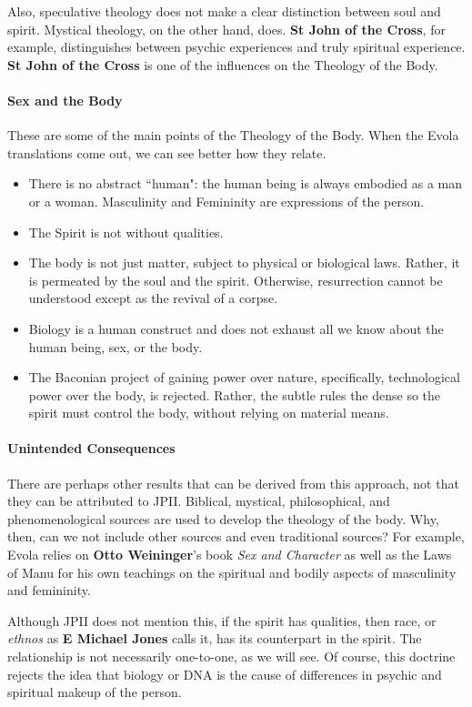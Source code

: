 Also, speculative theology does not make a clear distinction between soul and spirit. Mystical theology, on the other hand, does. \textbf{St John of the Cross}, for example, distinguishes between psychic experiences and truly spiritual experience. \textbf{St John of the Cross} is one of the influences on the Theology of the Body.

\paragraph{Sex and the Body}
These are some of the main points of the Theology of the Body. When the Evola translations come out, we can see better how they relate.

\begin{itemize}
\item There is no abstract ``human": the human being is always embodied as a man or a woman. Masculinity and Femininity are expressions of the person. 
\item The Spirit is not without qualities. 
\item The body is not just matter, subject to physical or biological laws. Rather, it is permeated by the soul and the spirit. Otherwise, resurrection cannot be understood except as the revival of a corpse. 
\item Biology is a human construct and does not exhaust all we know about the human being, sex, or the body. 
\item The Baconian project of gaining power over nature, specifically, technological power over the body, is rejected. Rather, the subtle rules the dense so the spirit must control the body, without relying on material means. 
\end{itemize}

\paragraph{Unintended Consequences}
There are perhaps other results that can be derived from this approach, not that they can be attributed to JPII. Biblical, mystical, philosophical, and phenomenological sources are used to develop the theology of the body. Why, then, can we not include other sources and even traditional sources? For example, Evola relies on \textbf{Otto Weininger}'s book \textit{Sex and Character} as well as the Laws of Manu for his own teachings on the spiritual and bodily aspects of masculinity and femininity.

Although JPII does not mention this, if the spirit has qualities, then race, or \emph{ethnos} as \textbf{E Michael Jones} calls it, has its counterpart in the spirit. The relationship is not necessarily one-to-one, as we will see. Of course, this doctrine rejects the idea that biology or DNA is the cause of differences in psychic and spiritual makeup of the person.

